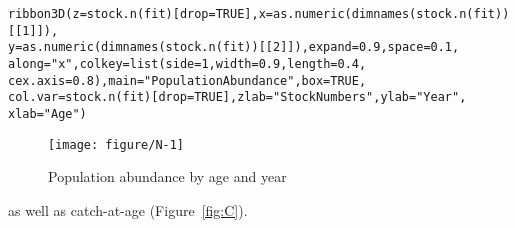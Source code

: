 \documentclass[a4paper,english,10pt]{article}\usepackage[]{graphicx}\usepackage[]{color}
\makeatletter
\def\maxwidth{ %
  \ifdim\Gin@nat@width>\linewidth
    \linewidth
  \else
    \Gin@nat@width
  \fi
}
\newcommand{\hlnum}[1]{\textcolor[rgb]{0.2,0.2,0.2}{#1}}%
\newcommand{\hlstr}[1]{\textcolor[rgb]{0.2,0.2,0.2}{#1}}%
\newcommand{\hlstd}[1]{\textcolor[rgb]{0,0,0}{#1}}%
\newcommand{\hlkwc}[1]{\textcolor[rgb]{0.361,0.506,0.596}{#1}}%
\newcommand{\hlkwd}[1]{\textcolor[rgb]{0.361,0.506,0.596}{#1}}%
\newenvironment{kframe}{%
 \def\at@end@of@kframe{}%
 \ifinner\ifhmode%
  \def\at@end@of@kframe{\end{minipage}}%
  \begin{minipage}{\columnwidth}%
 \fi\fi%
 \def\FrameCommand##1{\hskip\@totalleftmargin \hskip-\fboxsep
 \colorbox{shadecolor}{##1}\hskip-\fboxsep
     \hskip-\linewidth \hskip-\@totalleftmargin \hskip\columnwidth}%
 \MakeFramed {\advance\hsize-\width
   \@totalleftmargin\z@ \linewidth\hsize
   \@setminipage}}%
 {\par\unskip\endMakeFramed%
 \at@end@of@kframe}
\newenvironment{knitrout}{}{} %
\makeatother
\begin{document}
\begin{knitrout}
\color{fgcolor}\begin{kframe}
\begin{alltt}
\hlkwd{ribbon3D}\hlstd{(} \hlkwc{z} \hlstd{=} \hlkwd{stock.n}\hlstd{(fit)[}\hlkwc{drop}\hlstd{=}\hlnum{TRUE}\hlstd{],} \hlkwc{x}\hlstd{=} \hlkwd{as.numeric}\hlstd{(}\hlkwd{dimnames}\hlstd{(}\hlkwd{stock.n}\hlstd{(fit))[[}\hlnum{1}\hlstd{]]),}
          \hlkwc{y}\hlstd{=} \hlkwd{as.numeric}\hlstd{(}\hlkwd{dimnames}\hlstd{(}\hlkwd{stock.n}\hlstd{(fit))[[}\hlnum{2}\hlstd{]]) ,} \hlkwc{expand} \hlstd{=} \hlnum{0.9}\hlstd{,} \hlkwc{space} \hlstd{=} \hlnum{0.1}\hlstd{,}
          \hlkwc{along} \hlstd{=} \hlstr{"x"}\hlstd{,} \hlkwc{colkey} \hlstd{=} \hlkwd{list}\hlstd{(} \hlkwc{side}\hlstd{=}\hlnum{1}\hlstd{,} \hlkwc{width} \hlstd{=} \hlnum{0.9}\hlstd{,} \hlkwc{length} \hlstd{=} \hlnum{0.4}\hlstd{,}
          \hlkwc{cex.axis} \hlstd{=} \hlnum{0.8}\hlstd{),} \hlkwc{main}\hlstd{=}\hlstr{"Population Abundance"} \hlstd{,} \hlkwc{box} \hlstd{=} \hlnum{TRUE}\hlstd{,}
          \hlkwc{col.var}\hlstd{=}\hlkwd{stock.n}\hlstd{(fit)[}\hlkwc{drop}\hlstd{=}\hlnum{TRUE}\hlstd{],}   \hlkwc{zlab}\hlstd{=}\hlstr{"Stock Numbers"}\hlstd{,} \hlkwc{ylab}\hlstd{=}\hlstr{"Year"}\hlstd{,}
          \hlkwc{xlab}\hlstd{=}\hlstr{"Age"}\hlstd{)}
\end{alltt}
\end{kframe}\begin{figure}[H]

{\centering \texttt{[image: figure/N-1]} 

}

\caption[Population abundance by age and year]{Population abundance by age and year}\label{fig:N}
\end{figure}


\end{knitrout}

as well as catch-at-age (Figure~\ref{fig:C}).
\end{document}
